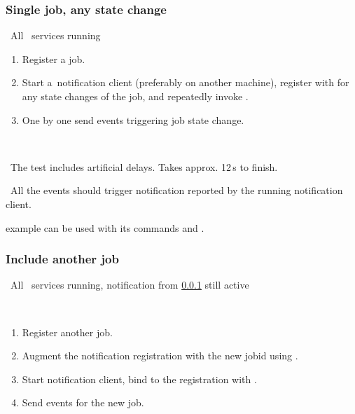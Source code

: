 \subsubsection{Single job, any state change}
\label{notif1}
\req\ All \LB\ services running

\what
\begin{enumerate}
\item Register a job.
\item Start a~notification client (preferably on another machine),
register with  for any state changes of the job,
and repeatedly invoke .
\item One by one send events triggering job state change.
\end{enumerate}

\how\ 

\note\ The test includes artificial delays. Takes approx. 12\,s to finish.

\result\ All the events should trigger notification reported by the running
notification client.

\begin{hints}
 example can be used with its commands  and .
\end{hints}



%
%
%
%



\subsubsection{Include another job}
\label{notif2}
\req\ All \LB\ services running, notification from \ref{notif1} still active

\how\
\begin{enumerate}
\item Register another job.
\item Augment the notification registration with the new jobid using
\code{edg\_wll\_NotifChange}.
\item Start notification client, bind to the registration with
.
\item Send events for the new job.
\end{enumerate}

